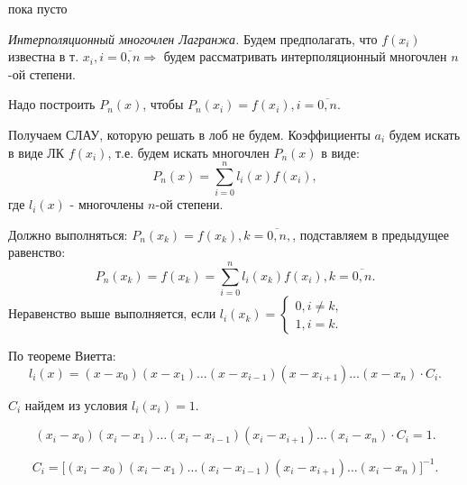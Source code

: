 \begin{col-answer-preambule}
	\begin{plan}
    \item пока пусто
	\end{plan}
\end{col-answer-preambule}


\textit{Интерполяционный многочлен Лагранжа.} \newline
Будем предполагать, что $f(x_i)$ известна в т. $x_i, i = \overline{0, n} \Rightarrow$ будем рассматривать интерполяционный многочлен $n$-ой степени. 

Надо построить $P_n(x)$, чтобы $P_n(x_i) = f(x_i), i = \overline{0, n}$.

Получаем СЛАУ, которую решать в лоб не будем. Коэффициенты $a_i$ будем искать в виде ЛК $f(x_i)$, т.е. будем искать многочлен $P_n(x)$ в виде:
\begin{equation*}
  P_n(x) = \sum\limits_{i = 0}^n l_i (x) f(x_i),
\end{equation*}
где $l_i (x)$ - многочлены $n$-ой степени.

Должно выполняться: $P_n (x_k) = f(x_k), k = \overline{0, n},$, подставляем в предыдущее равенство:
\begin{equation*}
  P_n (x_k) = f(x_k) = \sum\limits_{i = 0}^n l_i (x_k) f(x_i), k = \overline{0, n}.
\end{equation*}
Неравенство выше выполняется, если $l_i (x_k) = \begin{cases} 0, i \ne k, \\ 1, i = k. \end{cases}$

По теореме Виетта:
\begin{equation*}
  l_i(x) = (x - x_0) (x - x_1) \ldots (x - x_{i - 1}) (x - x_{i + 1}) \ldots (x - x_n) \cdot C_i.
\end{equation*}

$C_i$ найдем из условия $l_i (x_i) = 1$.

\begin{equation*}
  (x_i - x_0) (x_i - x_1) \ldots (x_i - x_{i - 1}) (x_i - x_{i + 1}) \ldots (x_i - x_n) \cdot C_i = 1.
\end{equation*}

\begin{equation*}
  C_i = \Big[(x_i - x_0) (x_i - x_1) \ldots (x_i - x_{i - 1}) (x_i - x_{i + 1}) \ldots (x_i - x_n)\Big]^{-1}.
\end{equation*}

